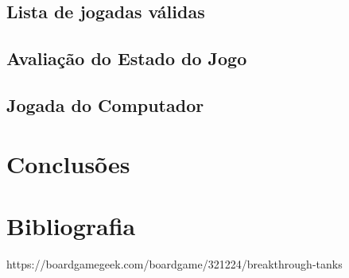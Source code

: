 \documentclass[a4paper,11pt,portuguese]{article}
\begin{document}


    \subsection{Lista de jogadas válidas}



    \subsection{Avaliação do Estado do Jogo}



    \subsection{Jogada do Computador}



\section{Conclusões}



\section{Bibliografia}

https://boardgamegeek.com/boardgame/321224/breakthrough-tanks
\end{document}
